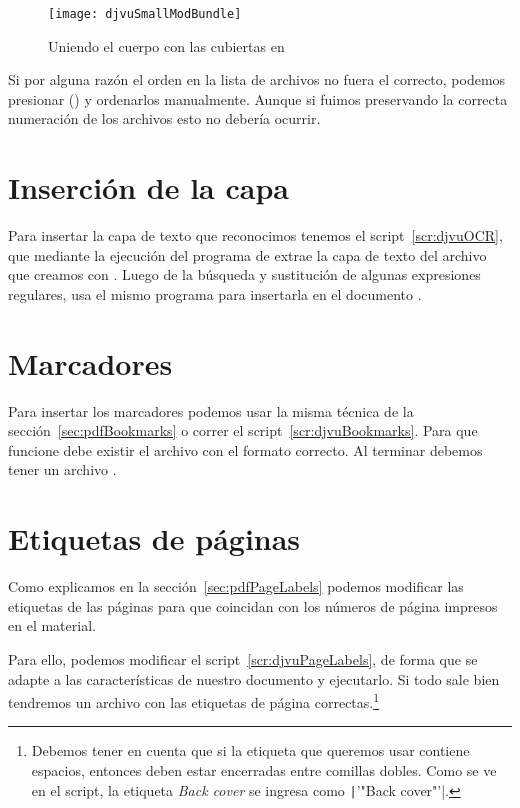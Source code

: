 \documentclass[%
	a5paper,
	10pt,
	twoside,
	openright,
	final,
]{memoir}
\begin{document}
{	\begin{figure}
		\texttt{[image: djvuSmallModBundle]}
		\caption{Uniendo el cuerpo con las cubiertas en \djvusmallmod\label{fig:djvuSmallModBundle}}
	\end{figure}

	Si por alguna razón el orden en la lista de archivos no fuera el correcto, podemos presionar  () y ordenarlos manualmente. Aunque si fuimos preservando la correcta numeración de los archivos esto no debería ocurrir.

	\section{Inserción de la capa \texorpdfstring{\ocr}{OCR}\label{sec:djvuOCR}} Para insertar la capa de texto que reconocimos tenemos el script~\ref{scr:djvuOCR}, que mediante la ejecución del programa  de \djvulibre extrae la capa de texto del archivo  que creamos con \abbyy. Luego de la búsqueda y sustitución de algunas expresiones regulares, usa el mismo programa para insertarla en el documento .


	\section{Marcadores\label{sec:djvuBookmarks}} Para insertar los marcadores podemos usar la misma técnica de la sección~\ref{sec:pdfBookmarks} o correr el script~\ref{scr:djvuBookmarks}. Para que funcione debe existir el archivo  con el formato correcto. Al terminar debemos tener un archivo .


	\section{Etiquetas de páginas\label{sec:djvuPageLabels}} Como explicamos en la sección~\ref{sec:pdfPageLabels} podemos modificar las etiquetas de las páginas para que coincidan con los números de página impresos en el material.

	Para ello, podemos modificar el script~\ref{scr:djvuPageLabels}, de forma que se adapte a las características de nuestro documento y ejecutarlo. Si todo sale bien tendremos un archivo  con las etiquetas de página correctas.\footnote{Debemos tener en cuenta que si la etiqueta que queremos usar contiene espacios, entonces deben estar encerradas entre comillas dobles. Como se ve en el script, la etiqueta \emph{Back cover} se ingresa como \texttt|'"Back cover"'|.}

}
\end{document}
